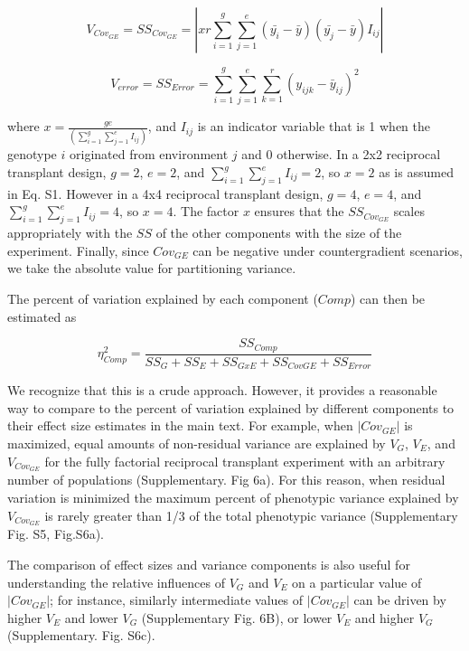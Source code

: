 \documentclass[11pt, oneside]{amsart}
\begin{document}
\begin{equation}
V_{Cov_{GE}}= SS_{Cov_{GE}} = | xr \sum_{i=1}^g\sum_{j=1}^e(\bar{y_i} - \bar{y})(\bar{y_j} - \bar{y})I_{ij} |
\end{equation}

\begin{equation}
V_{error} = SS_{Error} = \sum_{i=1}^g \sum_{j=1}^e \sum_{k=1}^r (y_{ijk}-\bar{y}_{ij})^2
\end{equation}

where $x = \frac{ge}{(\sum_{i=1}^g\sum_{j=1}^e I_{ij})}$, and $I_{ij}$ is an indicator variable that is 1 when the genotype $i$ originated from environment $j$ and 0 otherwise. In a 2x2 reciprocal transplant design, $g=2$, $e=2$, and $\sum_{i=1}^g\sum_{j=1}^e I_{ij}=2$, so $x = 2$ as is assumed in Eq. S1. However in a 4x4 reciprocal transplant design, $g=4$, $e=4$, and $\sum_{i=1}^g\sum_{j=1}^e I_{ij}=4$, so $x = 4$. The factor $x$ ensures that the $SS_{Cov_{GE}}$ scales appropriately with the $SS$ of the other components with the size of the experiment. Finally, since $Cov_{GE}$ can be negative under countergradient scenarios, we take the absolute value for partitioning variance.

The percent of variation explained by each component ($Comp$) can then be estimated as

\begin{equation}
\eta^2_{Comp} =  \frac{SS_{Comp}}{SS_G + SS_E + SS_{GxE} + SS_{CovGE} + SS_{Error}}
\end{equation}

We recognize that this is a crude approach. However, it provides a reasonable way to compare to the percent of variation explained by different components to their effect size estimates in the main text. For example, when $| Cov_{GE} |$ is maximized, equal amounts of non-residual variance are explained by $V_G$, $V_E$, and $V_{Cov_{GE}}$ for the fully factorial reciprocal transplant experiment with an arbitrary number of populations (Supplementary. Fig 6a). For this reason, when residual variation is minimized the maximum percent of phenotypic variance explained by $V_{Cov_{GE}}$ is rarely greater than 1/3 of the total phenotypic variance (Supplementary Fig. S5, Fig.S6a).

The comparison of effect sizes and variance components is also useful for understanding the relative influences of $V_G$ and $V_E$ on a particular value of $| Cov_{GE} |$; for instance, similarly intermediate values of $| Cov_{GE} |$ can be driven by higher $V_E$ and lower $V_G$ (Supplementary Fig. 6B), or lower $V_E$ and higher $V_G$ (Supplementary. Fig. S6c).
\end{document}
